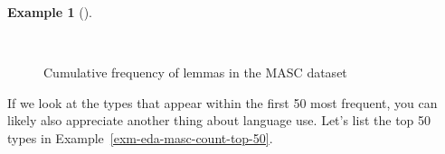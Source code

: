 \documentclass[
  letterpaper,
]{latex/krantz}
\theoremstyle{definition}
\newtheorem{example}{Example}[chapter]
\theoremstyle{remark}
\begin{document}
\begin{example}[]\protect\hypertarget{exm-eda-masc-count-cumulative}{}\label{exm-eda-masc-count-cumulative}

~

\begin{figure}[H]


\caption{\label{fig-eda-masc-count-cumulative}Cumulative frequency of
lemmas in the MASC dataset}

\end{figure}%

\end{example}

If we look at the types that appear within the first 50 most frequent,
you can likely also appreciate another thing about language use. Let's
list the top 50 types in Example~\ref{exm-eda-masc-count-top-50}.
\end{document}

